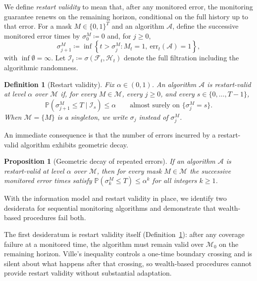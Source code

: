 \documentclass{uai2026} %
\newtheorem{proposition}[theorem]{Proposition}
\newtheorem{definition}[theorem]{Definition}
\newcommand{\1}{\mathbf{1}}
\newcommand{\prob}{\mathbb{P}}
\newcommand{\err}{\mathrm{err}}
\newcommand{\F}{\mathcal{F}}
\newcommand{\mcal}{\mathcal{M}}
\newcommand{\acal}{\mathcal{A}}
\begin{document}
We define \emph{restart validity} to mean that, after any monitored error, the monitoring guarantee renews on the remaining horizon, conditional on the full history up to that error.
For a mask $M\in\{0,1\}^{T}$ and an algorithm $\acal$, define the successive monitored error times by $\sigma_0^{M}\coloneqq 0$ and, for $j\ge 0$,
\begin{equation*}
  \sigma_{j+1}^{M}
  \coloneqq
  \inf\left\{t > \sigma_{j}^{M} \colon M_t=1,\ \err_t(\acal)=1 \right\},
\end{equation*}
with $\inf\emptyset=\infty$.
Let $\mathcal{I}_t\coloneqq \sigma(\F_t,\mathcal{H}_t)$ denote the full filtration including the algorithmic randomness.

\begin{definition}[Restart validity]
  \label{def:restart-valid}
  Fix $\alpha\in(0,1)$.
  An algorithm $\acal$ is \emph{restart-valid at level $\alpha$} over $\mcal$ if, for every $M\in\mcal$, every $j\ge 0$, and every $s\in\{0,\dots,T-1\}$,
  \begin{equation*}
    \prob(\sigma_{j+1}^{M}\le T \mid \mathcal{I}_s)
    \le \alpha
    \qquad \text{almost surely on }\{\sigma_j^{M}=s\}.
  \end{equation*}
  When $\mcal=\{M\}$ is a singleton, we write $\sigma_j$ instead of $\sigma_j^{M}$.
\end{definition}

An immediate consequence is that the number of errors incurred by a restart-valid algorithm exhibits geometric decay.

\begin{proposition}[Geometric decay of repeated errors]
  \label{prop:geom-decay}
  If an algorithm $\acal$ is restart-valid at level $\alpha$ over $\mcal$, then for every mask $M\in\mcal$ the successive monitored error times satisfy $\prob(\sigma_k^{M}\le T)\le \alpha^k$ for all integers $k\ge 1$.
\end{proposition}

With the information model and restart validity in place, we identify two desiderata for sequential monitoring algorithms and demonstrate that wealth-based procedures fail both.

The first desideratum is restart validity itself (Definition~\ref{def:restart-valid}): after any coverage failure at a monitored time, the algorithm must remain valid over $\mcal_0$ on the remaining horizon.
Ville's inequality controls a one-time boundary crossing and is silent about what happens after that crossing, so wealth-based procedures cannot provide restart validity without substantial adaptation.
\end{document}
